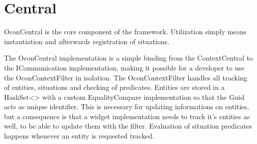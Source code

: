 \documentclass[../report.tex]{subfiles}
\begin{document}
\section{Central}
OconCentral is the core component of the framework. Utilization simply means instantiation and afterwards registration of situations.

The OconCentral implementation is a simple binding from the ContextCentral to the ICommunication implementation, making it possible for a developer to use the OconContextFilter in isolation. The OconContextFilter handles all tracking of entities, situations and checking of predicates. Entities are stored in a HashSet<> with a custom EqualityCompare implementation so that the Guid acts as unique identifier. This is necessary for updating informations on entities, but a consequence is that a widget implementation needs to track it's entities as well, to be able to update them with the filter. Evaluation of situation predicates happens whenever an entity is requested tracked.
\end{document}
